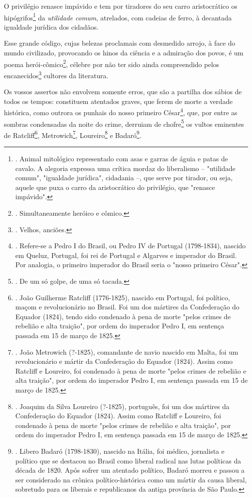 O privilégio renasce impávido e tem por tiradores do seu carro
aristocrático os hipógrifos\footnote{. Animal mitológico representado
  com asas e garras de águia e patas de cavalo. A alegoria expressa uma
  crítica mordaz do liberalismo -- "utilidade comum", "igualdade
  jurídica", cidadania --, que serve por tirador, ou seja, aquele que
  puxa o carro da aristocrático do privilégio, que "renasce impávido".}
da \emph{utilidade comum}, atrelados, com cadeias de ferro, à decantada
igualdade jurídica dos cidadãos.

Esse grande código, cujas belezas proclamais com desmedido arrojo, à
face do mundo civilizado, provocando os hinos da ciência e a admiração
dos povos, é um poema herói-cômico\footnote{. Simultaneamente heróico e
  cômico.}, célebre por não ter sido ainda compreendido pelos
encanecidos\footnote{. Velhos, anciões.} cultores da literatura.

Os vossos assertos não envolvem somente erros, que são a partilha dos
sábios de todos os tempos: constituem atentados graves, que ferem de
morte a verdade histórica, como outrora os punhais do nosso primeiro
César\footnote{. Refere-se a Pedro I do Brasil, ou Pedro IV de Portugal
  (1798-1834), nascido em Queluz, Portugal, foi rei de Portugal e
  Algarves e imperador do Brasil. Por analogia, o primeiro imperador do
  Brasil seria o "nosso primeiro César".}, que, por entre as sombras
condensadas da noite do crime, derruiam de chofre\footnote{. De um só
  golpe, de uma só tacada.} os vultos eminentes de Ratcliff\footnote{.
  João Guilherme Ratcliff (1776-1825), nascido em Portugal, foi
  político, maçom e revolucionário no Brasil. Foi um dos mártires da
  Confederação do Equador (1824), tendo sido condenado à pena de morte
  "pelos crimes de rebelião e alta traição", por ordem do imperador
  Pedro I, em sentença passada em 15 de março de 1825.},
Metrowich\footnote{. João Metrowich (?-1825), comandante de navio
  nascido em Malta, foi um revolucionário e mártir da Confederação do
  Equador (1824). Assim como Ratcliff e Loureiro, foi condenado à pena
  de morte "pelos crimes de rebelião e alta traição", por ordem do
  imperador Pedro I, em sentença passada em 15 de março de 1825.},
Loureiro\footnote{. Joaquim da Silva Loureiro (?-1825), português, foi
  um dos mártires da Confederação do Equador (1824). Assim como Ratcliff
  e Loureiro, foi condenado à pena de morte "pelos crimes de rebelião e
  alta traição", por ordem do imperador Pedro I, em sentença passada em
  15 de março de 1825.} e Badaró\footnote{. Libero Badaró (1798-1830),
  nascido na Itália, foi médico, jornalista e político que se destacou
  no Brasil como liberal radical nas lutas políticas da década de 1820.
  Após sofrer um atentado político, Badaró morreu e passou a ser
  considerado na crônica político-histórica como um mártir da causa
  liberal, sobretudo para os liberais e republicanos da antiga província
  de São Paulo.}.

